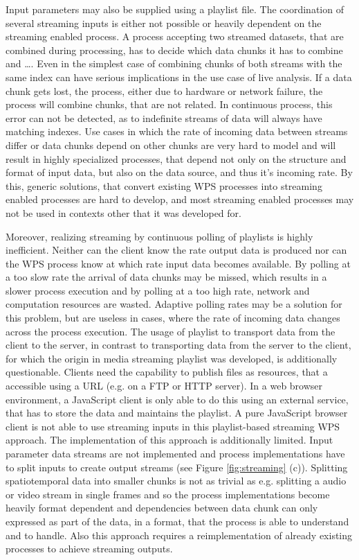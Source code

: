 	Input parameters may also be supplied using a playlist file. The coordination of several streaming inputs is either not possible or heavily dependent on the streaming enabled process. A process accepting two streamed datasets, that are combined during processing, has to decide which data chunks it has to combine and \dots. Even in the simplest case of combining chunks of both streams with the same index can have serious implications in the use case of live analysis. If a data chunk gets lost, the process, either due to hardware or network failure, the process will combine chunks, that are not related. In continuous process, this error can not be detected, as to indefinite streams of data will always have matching indexes. Use cases in which the rate of incoming data between streams differ or data chunks depend on other chunks are very hard to model and will result in highly specialized processes, that
	depend not only on the structure and format of input data, but also on the data source, and thus it's incoming rate. By this, generic solutions, that convert existing \ac{WPS} processes into streaming enabled processes are hard to develop, and most streaming enabled processes may not be used in contexts other that it was developed for.

	Moreover, realizing streaming by continuous polling of playlists is highly inefficient. Neither can the client know the rate output data is produced nor can the \ac{WPS} process know at which rate input data becomes available. By polling at a too slow rate the arrival of data chunks may be missed, which results in a slower process execution and by polling at a too high rate, network and computation resources are wasted. Adaptive polling rates may be a solution for this problem, but are useless in cases, where the rate of incoming data changes across the process execution. The usage of playlist to transport data from the client to the server, in contrast to transporting data from the server to the client, for which the origin in media streaming playlist was developed, is additionally questionable. Clients need the capability to publish files as resources, that a accessible using a URL (e.g. on a FTP or HTTP server). In a web browser environment, a JavaScript client is only able to do this using an external service, that has to store the data and maintains the playlist. A pure JavaScript browser client is not able to use streaming inputs in this playlist-based streaming \ac{WPS} approach. The implementation of this approach is additionally limited. Input parameter data streams are not implemented and process implementations have to split inputs to create output streams (see Figure \ref{fig:streaming} (c)). Splitting spatiotemporal data into smaller chunks is not as trivial as e.g. splitting a audio or video stream in single frames and so the process implementations become heavily format dependent and dependencies between data chunk can only expressed as part of the data, in a format, that the process is able to understand and to handle. Also this approach requires a reimplementation of already existing processes to achieve streaming outputs.

